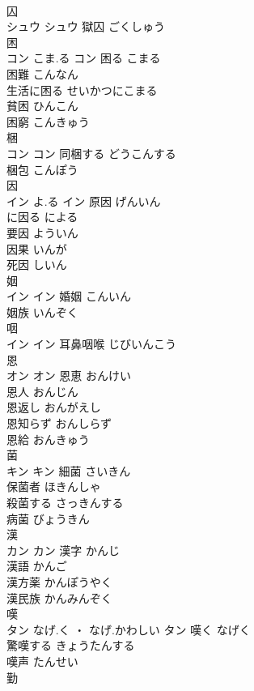 \documentclass[8pt]{extreport}
\begin{document}
\begin{CJK}{UTF8}{min}
\\	囚	
\\	シュウ		シュウ													獄囚	ごくしゅう	
\\	困	
\\	コン	こま.る	コン	困る	こまる	
\\	困難	こんなん	
\\	生活に困る	せいかつにこまる	
\\	貧困	ひんこん	
\\	困窮	こんきゅう	
\\	梱	
\\	コン		コン	同梱する	どうこんする	
\\	梱包	こんぽう	
\\	因	
\\	イン	よ.る	イン	原因	げんいん	
\\	に因る	による	
\\	要因	よういん	
\\	因果	いんが	
\\	死因	しいん	
\\	姻	
\\	イン		イン	婚姻	こんいん	
\\	姻族	いんぞく	
\\	咽	
\\	イン		イン													耳鼻咽喉	じびいんこう	
\\	恩	
\\	オン		オン	恩恵	おんけい	
\\	恩人	おんじん	
\\	恩返し	おんがえし	
\\	恩知らず	おんしらず	
\\	恩給	おんきゅう	
\\	菌	
\\	キン		キン	細菌	さいきん	
\\	保菌者	ほきんしゃ	
\\	殺菌する	さっきんする	
\\	病菌	びょうきん	
\\	漢	
\\	カン		カン	漢字	かんじ	
\\	漢語	かんご	
\\	漢方薬	かんぽうやく	
\\	漢民族	かんみんぞく	
\\	嘆	
\\	タン	なげ.く ・ なげ.かわしい	タン	嘆く	なげく	
\\	驚嘆する	きょうたんする	
\\	嘆声	たんせい	
\\	勤	

\end{CJK}
\end{document}
